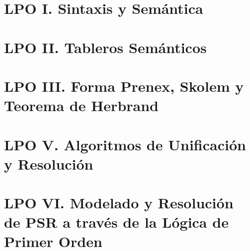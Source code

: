 \documentclass[a4paper]{report}
\begin{document}
\chapter{LPO I. Sintaxis y Semántica}
\renewcommand{\mtctitle}{}
\mtcskip
\minitoc
\newpage
\chapter{LPO II. Tableros Semánticos}
\renewcommand{\mtctitle}{}
\mtcskip
\minitoc
\newpage
\chapter{LPO III. Forma Prenex, Skolem y Teorema de Herbrand}
\renewcommand{\mtctitle}{}
\mtcskip
\minitoc
\newpage
\chapter{LPO V. Algoritmos de Unificación y Resolución}
\renewcommand{\mtctitle}{}
\mtcskip
\minitoc
\newpage
\chapter{LPO VI. Modelado y Resolución de PSR a través de la Lógica de Primer Orden}
\renewcommand{\mtctitle}{}
\mtcskip
\minitoc
\newpage
\end{document}
